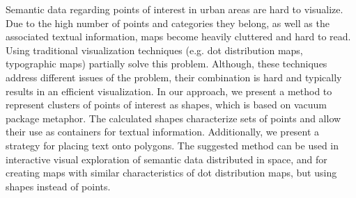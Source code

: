Semantic data regarding points of interest in urban areas are hard to visualize. Due to the high number of points and categories they belong, as well as the associated textual information, maps become heavily cluttered and hard to read. Using traditional visualization techniques (e.g. dot distribution maps, typographic maps) partially solve this problem. Although, these techniques address different issues of the problem, their combination is hard and typically results in an efficient visualization. In our approach, we present a method to represent clusters of points of interest as shapes, which is based on vacuum package metaphor. The calculated shapes characterize sets of points and allow their use as containers for textual information. Additionally, we present a strategy for placing text onto polygons. The suggested method can be used in interactive visual exploration of semantic data distributed in space, and for creating maps with similar characteristics of dot distribution maps, but using shapes instead of points.
